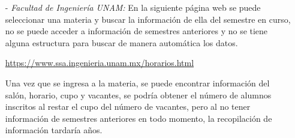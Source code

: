 \begin{itemize}
%
%
%


\item[-] \textit{Facultad de Ingeniería UNAM:} En la siguiente página web se puede seleccionar una materia y buscar la información de ella del semestre en curso, no se puede acceder a información de semestres anteriores y no se tiene alguna estructura para buscar de manera automática los datos.

\url{https://www.ssa.ingenieria.unam.mx/horarios.html}

Una vez que se ingresa a la materia, se puede encontrar información del salón, horario, cupo y vacantes, se podría obtener el número de alumnos inscritos al restar el cupo del número de vacantes, pero al no tener información de semestres anteriores en todo momento, la recopilación de información tardaría años.

%

%
%
%


\end{itemize}
